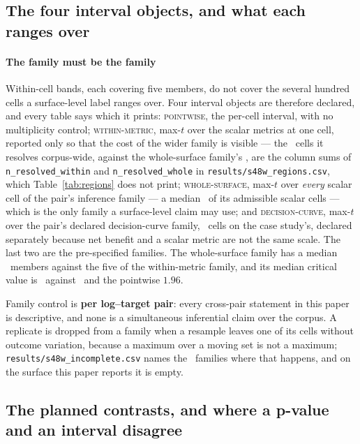 \subsection{The four interval objects, and what each ranges over}
\label{app:families}


\paragraph{The family must be the family}
Within-cell bands, each covering five members, do not cover the several
hundred cells a surface-level label ranges over. Four interval objects are
therefore declared, and every table says which it prints: \textsc{pointwise},
the per-cell interval, with no multiplicity control; \textsc{within-metric},
max-$t$ over the scalar metrics at one cell, reported only so that the
cost of the wider family is visible --- the \nResolvedWithin\ cells it
resolves corpus-wide, against the whole-surface family's \nResolvedWhole,
are the column sums of \texttt{n\_resolved\_within} and
\texttt{n\_resolved\_whole} in \texttt{results/s48w\_regions.csv}, which
Table~\ref{tab:regions} does not print; \textsc{whole-surface}, max-$t$ over
\emph{every} scalar cell of the pair's inference family --- a median
\inferenceShareAdmissibleMedianPct\ of its admissible scalar cells --- which
is the only family a surface-level claim may use; and
\textsc{decision-curve}, max-$t$ over the pair's declared decision-curve
family, \nDcaFamily\ cells on the case study's, declared separately because
net benefit and a scalar metric are not the same scale. The last two are the
pre-specified families. The whole-surface family has a median
\familySizeMedian\ members against the five of the within-metric family,
and its median critical value is \maxTSurfaceMedian\ against
\maxTWithinMedian\ and the pointwise $1.96$.

Family control is \textbf{per log--target pair}: every cross-pair statement in
this paper is descriptive, and none is a simultaneous inferential claim over
the corpus. A replicate is dropped from a family when a resample leaves one of
its cells without outcome variation, because a maximum over a moving set is
not a maximum; \texttt{results/s48w\_incomplete.csv} names the
\nIncompleteFamilies\ families where that happens, and on the surface this
paper reports it is empty.

\subsection{The planned contrasts, and where a p-value and an interval disagree}
\label{app:pcdetail}

